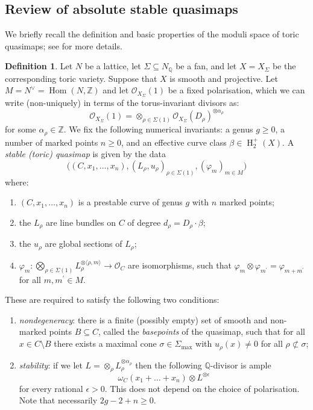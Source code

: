 \documentclass[11pt]{amsart}
\newcommand{\Z}{\mathbb{Z}}
\newcommand{\OO}{\mathcal{O}}
\renewcommand{\to}{\rightarrow}
\newcommand{\Hom}{\operatorname{Hom}}
\newcommand{\QQ}{\mathbb{Q}}
\newcommand{\HH}{\operatorname{H}}
\theoremstyle{definition}
\theoremstyle{definition}
\newtheorem{definition}[thm]{Definition}
\newcommand{\ilemph}[1]{\emph{#1}}
\begin{document}
\subsection{Review of absolute stable quasimaps} \label{Subsection stable quasimaps}
We briefly recall the definition and basic properties of the moduli space of toric quasimaps; see \cite{CF-K} for more details.
\begin{definition}\cite[Definition 3.1.1]{CF-K} Let $N$ be a lattice, let $\Sigma \subseteq N_{\QQ}$ be a fan, and let $X= X_{\Sigma}$ be the corresponding toric variety.  Suppose that $X$ is smooth and projective.   Let $M = N^\vee = \Hom(N,\Z)$ and let $\OO_{X_\Sigma}(1)$ be a fixed polarisation, which we can write (non-uniquely) in terms of the torus-invariant divisors as:
\begin{equation*} \OO_{X_\Sigma}(1) = \otimes_{\rho \in \Sigma(1)} \OO_{X_\Sigma}(D_\rho)^{\otimes \alpha_\rho} \end{equation*}
for some $\alpha_\rho \in \Z$. We fix the following numerical invariants: a genus $g \geq 0$, a number of marked points $n \geq 0$, and an effective curve class $\beta \in \HH_2^+(X)$. A \ilemph{stable (toric) quasimap} is given by the data
\begin{equation*} \Big((C,x_1,\ldots,x_n), (L_\rho,u_\rho)_{\rho \in \Sigma(1)}, (\varphi_m)_{m \in M}\Big) \end{equation*}
where:
\begin{enumerate}
\item $(C,x_1,\ldots,x_n)$ is a prestable curve of genus $g$ with $n$ marked points;
\item the $L_\rho$ are line bundles on $C$ of degree $d_\rho = D_\rho \cdot \beta$;
\item the $u_\rho$ are global sections of $L_\rho$;
\item $\varphi_m \colon \bigotimes_{\rho \in \Sigma(1)} L_\rho^{\otimes \langle \rho, m \rangle} \to \OO_C$ are isomorphisms, such that $\varphi_{m} \otimes \varphi_{m^\prime} = \varphi_{m + m^\prime}$ for all $m, m^\prime \in M$.
\end{enumerate}
These are required to satisfy the following two conditions:
\begin{enumerate}
\item \ilemph{nondegeneracy}: there is a finite (possibly empty) set of smooth and non-marked points $B \subseteq C$, called the \ilemph{basepoints} of the quasimap, such that for all $x \in C \setminus B$ there exists a maximal cone $\sigma \in \Sigma_{\operatorname{max}}$ with $u_\rho(x) \neq 0$ for all $\rho \not\subset \sigma$;
\item \ilemph{stability}: if we let $L = \otimes_\rho L_\rho^{\otimes \alpha_\rho}$ then the following $\QQ$-divisor is ample
\begin{equation*} \omega_C(x_1 + \ldots + x_n)\otimes L^{\otimes \epsilon} \end{equation*}
for every rational $\epsilon > 0$.  This does not depend on the choice of polarisation. Note that necessarily $2g-2+n \geq 0$.
\end{enumerate}
\end{definition}
\end{document}

